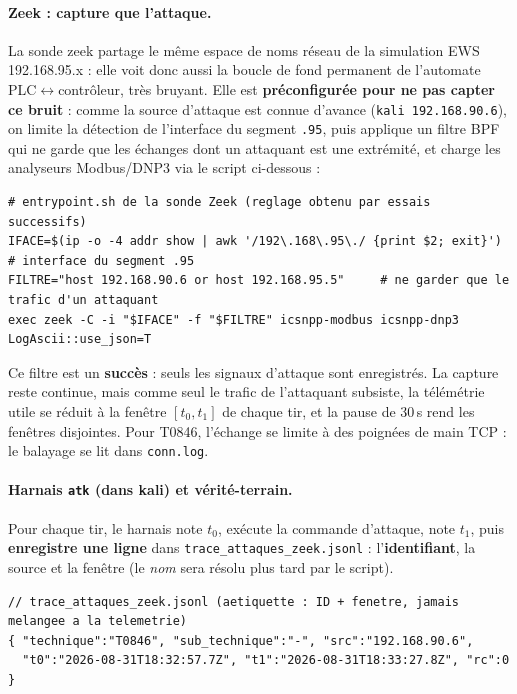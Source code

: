 \paragraph{Zeek : capture que l'attaque.} La sonde zeek partage le même espace de
noms réseau de la simulation EWS 192.168.95.x : elle voit donc aussi la boucle de fond permanent de l'automate PLC$\leftrightarrow$contrôleur, très bruyant. Elle est \textbf{préconfigurée pour
ne pas capter ce bruit} : comme la source d'attaque est connue d'avance
(\texttt{kali 192.168.90.6}), on limite la détection de l'interface du segment
\texttt{.95}, puis applique un filtre BPF qui ne garde que les échanges dont un
attaquant est une extrémité, et charge les analyseurs Modbus/DNP3 via le script ci-dessous :

\begin{lstlisting}[style=bash]
# entrypoint.sh de la sonde Zeek (reglage obtenu par essais successifs)
IFACE=$(ip -o -4 addr show | awk '/192\.168\.95\./ {print $2; exit}')   # interface du segment .95
FILTRE="host 192.168.90.6 or host 192.168.95.5"     # ne garder que le trafic d'un attaquant
exec zeek -C -i "$IFACE" -f "$FILTRE" icsnpp-modbus icsnpp-dnp3 LogAscii::use_json=T
\end{lstlisting}

\noindent Ce filtre est un \textbf{succès} : seuls les signaux d'attaque sont
enregistrés. La capture reste continue, mais comme seul le trafic de l'attaquant
subsiste, la télémétrie utile se réduit à la fenêtre $[t_0,t_1]$ de chaque tir, et
la pause de 30\,s rend les fenêtres disjointes. Pour T0846, l'échange se limite à
des poignées de main TCP : le balayage se lit dans \texttt{conn.log}.

\paragraph{Harnais \texttt{atk} (dans kali) et vérité-terrain.} Pour chaque tir, le
harnais note $t_0$, exécute la commande d'attaque, note $t_1$, puis
\textbf{enregistre une ligne} dans \texttt{trace\_attaques\_zeek.jsonl} :
l'\textbf{identifiant}, la source et la fenêtre (le \emph{nom} sera résolu plus tard
par le script).

\begin{lstlisting}[style=json]
// trace_attaques_zeek.jsonl (aetiquette : ID + fenetre, jamais melangee a la telemetrie)
{ "technique":"T0846", "sub_technique":"-", "src":"192.168.90.6",
  "t0":"2026-08-31T18:32:57.7Z", "t1":"2026-08-31T18:33:27.8Z", "rc":0 }
\end{lstlisting}

